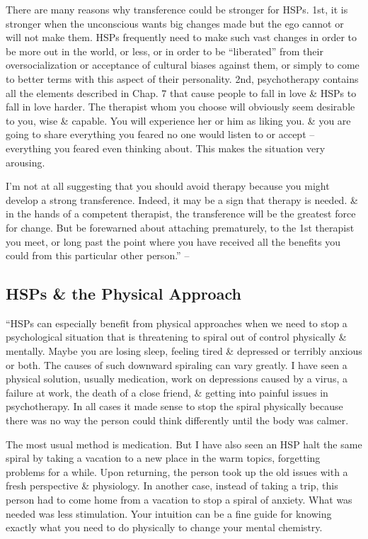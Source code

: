 \documentclass{article}
\numberwithin{equation}{section}
\begin{document}
There are many reasons why transference could be stronger for HSPs. 1st, it is stronger when the unconscious wants big changes made but the ego cannot or will not make them. HSPs frequently need to make such vast changes in order to be more out in the world, or less, or in order to be ``liberated'' from their oversocialization or acceptance of cultural biases against them, or simply to come to better terms with this aspect of their personality. 2nd, psychotherapy contains all the elements described in Chap. 7 that cause people to fall in love \& HSPs to fall in love harder. The therapist whom you choose will obviously seem desirable to you, wise \& capable. You will experience her or him as liking you. \& you are going to share everything you feared no one would listen to or accept -- everything you feared even thinking about. This makes the situation very arousing.

I'm not at all suggesting that you should avoid therapy because you might develop a strong transference. Indeed, it may be a sign that therapy is needed. \& in the hands of a competent therapist, the transference will be the greatest force for change. But be forewarned about attaching prematurely, to the 1st therapist you meet, or long past the point where you have received all the benefits you could from this particular other person.'' -- \cite[pp. 209--211]{Aron2013}

\subsection{HSPs \& the Physical Approach}
``HSPs can especially benefit from physical approaches when we need to stop a psychological situation that is threatening to spiral out of control physically \& mentally. Maybe you are losing sleep, feeling tired \& depressed or terribly anxious or both. The causes of such downward spiraling can vary greatly. I have seen a physical solution, usually medication, work on depressions caused by a virus, a failure at work, the death of a close friend, \& getting into painful issues in psychotherapy. In all cases it made sense to stop the spiral physically because there was no way the person could think differently until the body was calmer.

The most usual method is medication. But I have also seen an HSP halt the same spiral by taking a vacation to a new place in the warm topics, forgetting problems for a while. Upon returning, the person took up the old issues with a fresh perspective \& physiology. In another case, instead of taking a trip, this person had to come home from a vacation to stop a spiral of anxiety. What was needed was less stimulation. Your intuition can be a fine guide for knowing exactly what you need to do physically to change your mental chemistry.
\end{document}
